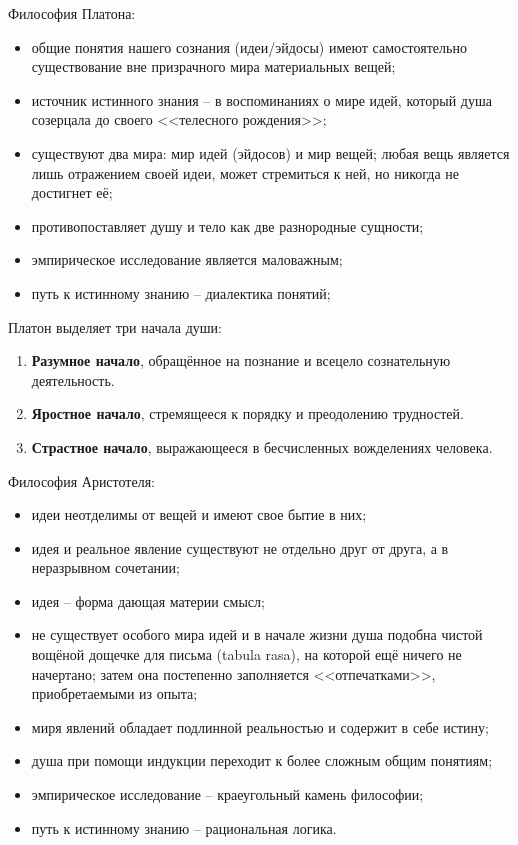 
Философия Платона:
\begin{itemize}
    \itemsep-1ex
    \item общие понятия нашего сознания (идеи/эйдосы) имеют самостоятельно существование вне призрачного мира 
        материальных вещей;
    \item источник истинного знания -- в воспоминаниях о мире идей, который душа созерцала до своего 
        <<телесного рождения>>;
    \item существуют два мира: мир идей (эйдосов) и мир вещей; любая вещь является лишь отражением своей 
        идеи, может стремиться к ней, но никогда не достигнет её;
    \item противопоставляет душу и тело как две разнородные сущности;
    \item эмпирическое исследование является маловажным;
    \item путь к истинному знанию -- диалектика понятий;
\end{itemize}

Платон выделяет три начала души:
\begin{enumerate}
    \itemsep-1ex
    \item \textbf{Разумное начало}, обращённое на познание и всецело сознательную деятельность.
    \item \textbf{Яростное начало}, стремящееся к порядку и преодолению трудностей.
    \item \textbf{Страстное начало}, выражающееся в бесчисленных вожделениях человека.
\end{enumerate}

Философия Аристотеля:
\begin{itemize}
    \itemsep-1ex
    \item идеи неотделимы от вещей и имеют свое бытие в них;
    \item идея и реальное явление существуют не отдельно друг от друга, а в неразрывном сочетании;
    \item идея -- форма дающая материи смысл;
    \item не существует особого мира идей и в начале жизни душа подобна чистой вощёной дощечке для письма 
        (tabula rasa), на которой ещё ничего не начертано; затем она постепенно заполняется <<отпечатками>>, 
        приобретаемыми из опыта;
    \item миря явлений обладает подлинной реальностью и содержит в себе истину;
    \item душа при помощи индукции переходит к более сложным общим понятиям;
    \item эмпирическое исследование -- краеугольный камень философии;
    \item путь к истинному знанию -- рациональная логика.
\end{itemize}

